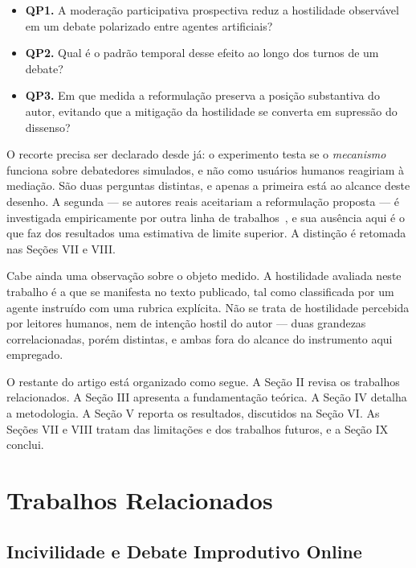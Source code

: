 \documentclass[conference]{IEEEtran} \IEEEoverridecommandlockouts %
\begin{document}
\begin{itemize}
  \item \textbf{QP1.} A moderação participativa prospectiva reduz a
        hostilidade observável em um debate polarizado entre agentes
        artificiais?
  \item \textbf{QP2.} Qual é o padrão temporal desse efeito ao longo dos
        turnos de um debate?
  \item \textbf{QP3.} Em que medida a reformulação preserva a posição
        substantiva do autor, evitando que a mitigação da hostilidade se
        converta em supressão do dissenso?
\end{itemize}

O recorte precisa ser declarado desde já: o experimento testa se o
\textit{mecanismo} funciona sobre debatedores simulados, e não como usuários
humanos reagiriam à mediação. São duas perguntas distintas, e apenas a primeira
está ao alcance deste desenho. A segunda — se autores reais aceitariam a
reformulação proposta — é investigada empiricamente por outra linha de
trabalhos~\cite{argyle2023leveraging,katsaros2022reconsidering}, e sua ausência
aqui é o que faz dos resultados uma estimativa de limite superior. A distinção
é retomada nas Seções VII e VIII.

Cabe ainda uma observação sobre o objeto medido. A hostilidade avaliada neste
trabalho é a que se manifesta no texto publicado, tal como classificada por um
agente instruído com uma rubrica explícita. Não se trata de hostilidade
percebida por leitores humanos, nem de intenção hostil do autor — duas
grandezas correlacionadas, porém distintas, e ambas fora do alcance do
instrumento aqui empregado.

O restante do artigo está organizado como segue. A Seção II revisa os trabalhos
relacionados. A Seção III apresenta a fundamentação teórica. A Seção IV detalha
a metodologia. A Seção V reporta os resultados, discutidos na Seção VI. As
Seções VII e VIII tratam das limitações e dos trabalhos futuros, e a Seção IX
conclui.

\section{Trabalhos Relacionados}

\subsection{Incivilidade e Debate Improdutivo Online}
\end{document}
